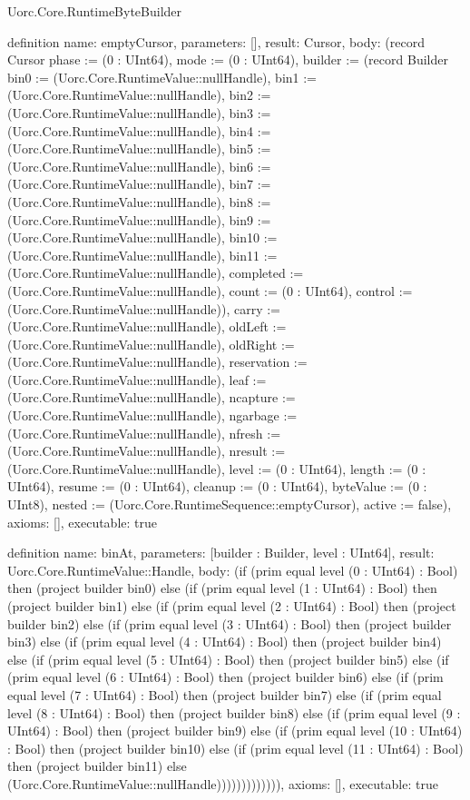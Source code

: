 \begin{lexlean}{Uorc.Core.RuntimeByteBuilder}
\begin{semanticmodule}
definition{
  name: emptyCursor,
  parameters: [],
  result: Cursor,
  body: (record Cursor {phase := (0 : UInt64), mode := (0 : UInt64), builder := (record Builder {bin0 := (Uorc.Core.RuntimeValue::nullHandle), bin1 := (Uorc.Core.RuntimeValue::nullHandle), bin2 := (Uorc.Core.RuntimeValue::nullHandle), bin3 := (Uorc.Core.RuntimeValue::nullHandle), bin4 := (Uorc.Core.RuntimeValue::nullHandle), bin5 := (Uorc.Core.RuntimeValue::nullHandle), bin6 := (Uorc.Core.RuntimeValue::nullHandle), bin7 := (Uorc.Core.RuntimeValue::nullHandle), bin8 := (Uorc.Core.RuntimeValue::nullHandle), bin9 := (Uorc.Core.RuntimeValue::nullHandle), bin10 := (Uorc.Core.RuntimeValue::nullHandle), bin11 := (Uorc.Core.RuntimeValue::nullHandle), completed := (Uorc.Core.RuntimeValue::nullHandle), count := (0 : UInt64), control := (Uorc.Core.RuntimeValue::nullHandle)}), carry := (Uorc.Core.RuntimeValue::nullHandle), oldLeft := (Uorc.Core.RuntimeValue::nullHandle), oldRight := (Uorc.Core.RuntimeValue::nullHandle), reservation := (Uorc.Core.RuntimeValue::nullHandle), leaf := (Uorc.Core.RuntimeValue::nullHandle), ncapture := (Uorc.Core.RuntimeValue::nullHandle), ngarbage := (Uorc.Core.RuntimeValue::nullHandle), nfresh := (Uorc.Core.RuntimeValue::nullHandle), nresult := (Uorc.Core.RuntimeValue::nullHandle), level := (0 : UInt64), length := (0 : UInt64), resume := (0 : UInt64), cleanup := (0 : UInt64), byteValue := (0 : UInt8), nested := (Uorc.Core.RuntimeSequence::emptyCursor), active := false}),
  axioms: [],
  executable: true
}

definition{
  name: binAt,
  parameters: [builder : Builder, level : UInt64],
  result: Uorc.Core.RuntimeValue::Handle,
  body: (if (prim equal level (0 : UInt64) : Bool) then (project builder bin0) else (if (prim equal level (1 : UInt64) : Bool) then (project builder bin1) else (if (prim equal level (2 : UInt64) : Bool) then (project builder bin2) else (if (prim equal level (3 : UInt64) : Bool) then (project builder bin3) else (if (prim equal level (4 : UInt64) : Bool) then (project builder bin4) else (if (prim equal level (5 : UInt64) : Bool) then (project builder bin5) else (if (prim equal level (6 : UInt64) : Bool) then (project builder bin6) else (if (prim equal level (7 : UInt64) : Bool) then (project builder bin7) else (if (prim equal level (8 : UInt64) : Bool) then (project builder bin8) else (if (prim equal level (9 : UInt64) : Bool) then (project builder bin9) else (if (prim equal level (10 : UInt64) : Bool) then (project builder bin10) else (if (prim equal level (11 : UInt64) : Bool) then (project builder bin11) else (Uorc.Core.RuntimeValue::nullHandle))))))))))))),
  axioms: [],
  executable: true
}


\end{semanticmodule}
\end{lexlean}
